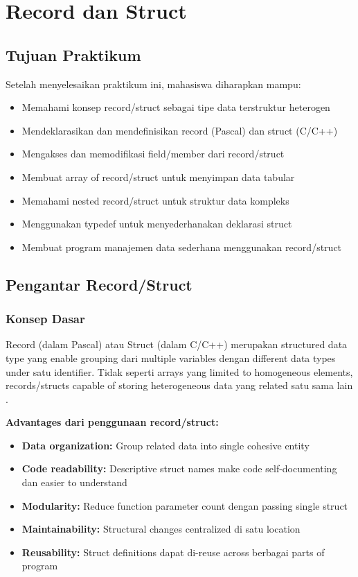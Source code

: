 \documentclass[../main.tex]{subfiles}
\begin{document}
\chapter{Record dan Struct}

\section*{Tujuan Praktikum}
Setelah menyelesaikan praktikum ini, mahasiswa diharapkan mampu:
\begin{itemize}
  \item Memahami konsep record/struct sebagai tipe data terstruktur heterogen
  \item Mendeklarasikan dan mendefinisikan record (Pascal) dan struct (C/C++)
  \item Mengakses dan memodifikasi field/member dari record/struct
  \item Membuat array of record/struct untuk menyimpan data tabular
  \item Memahami nested record/struct untuk struktur data kompleks
  \item Menggunakan typedef untuk menyederhanakan deklarasi struct
  \item Membuat program manajemen data sederhana menggunakan record/struct
\end{itemize}

\section{Pengantar Record/Struct}

\subsection{Konsep Dasar}
Record (dalam Pascal) atau Struct (dalam C/C++) merupakan structured data type yang enable grouping dari multiple variables dengan different data types under satu identifier. Tidak seperti arrays yang limited to homogeneous elements, records/structs capable of storing heterogeneous data yang related satu sama lain \parencite{pascal-structs,c-struct,cpp-struct-class,duniailkom-struct-c,tutorialspoint-c-structures}.

\textbf{Advantages dari penggunaan record/struct:}
\begin{itemize}
  \item \textbf{Data organization:} Group related data into single cohesive entity
  \item \textbf{Code readability:} Descriptive struct names make code self-documenting dan easier to understand
  \item \textbf{Modularity:} Reduce function parameter count dengan passing single struct
  \item \textbf{Maintainability:} Structural changes centralized di satu location
  \item \textbf{Reusability:} Struct definitions dapat di-reuse across berbagai parts of program
\end{itemize}
\end{document}
